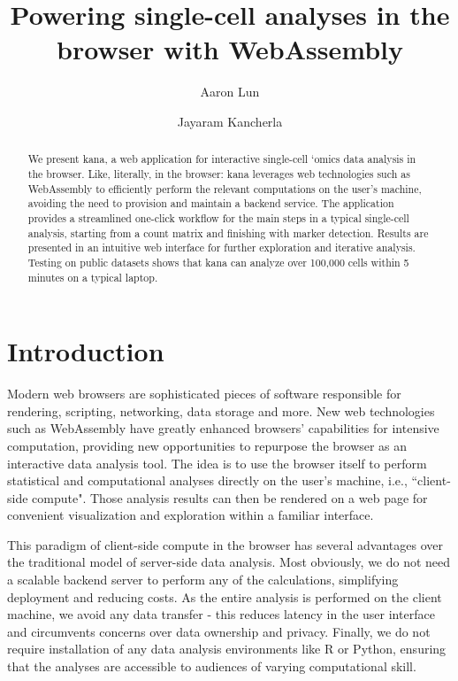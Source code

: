\documentclass{article}
\title{Powering single-cell analyses in the browser with WebAssembly}
\author[1]{Aaron Lun}
\affil[1]{Genentech, Inc. South San Francisco, CA}
\author[1]{Jayaram Kancherla}
\begin{document}
\maketitle

\newcommand{\pending}[1]{\textcolor{red}{#1}}

\begin{abstract}
We present kana, a web application for interactive single-cell `omics data analysis in the browser.
Like, literally, in the browser:
kana leverages web technologies such as WebAssembly to efficiently perform the relevant computations on the user's machine,
avoiding the need to provision and maintain a backend service. 
The application provides a streamlined one-click workflow for the main steps in a typical single-cell analysis, 
starting from a count matrix and finishing with marker detection.
Results are presented in an intuitive web interface for further exploration and iterative analysis. 
Testing on public datasets shows that kana can analyze over 100,000 cells within 5 minutes on a typical laptop.
\end{abstract}

\section{Introduction}

Modern web browsers are sophisticated pieces of software responsible for rendering, scripting, networking, data storage and more.
New web technologies such as WebAssembly \cite{haas2017bringing} have greatly enhanced browsers' capabilities for intensive computation,
providing new opportunities to repurpose the browser as an interactive data analysis tool.
The idea is to use the browser itself to perform statistical and computational analyses directly on the user's machine, i.e., ``client-side compute". 
Those analysis results can then be rendered on a web page for convenient visualization and exploration within a familiar interface.

This paradigm of client-side compute in the browser has several advantages over the traditional model of server-side data analysis.
Most obviously, we do not need a scalable backend server to perform any of the calculations, simplifying deployment and reducing costs.
As the entire analysis is performed on the client machine, we avoid any data transfer - this reduces latency in the user interface and circumvents concerns over data ownership and privacy.
Finally, we do not require installation of any data analysis environments like R or Python, ensuring that the analyses are accessible to audiences of varying computational skill.
\end{document}
